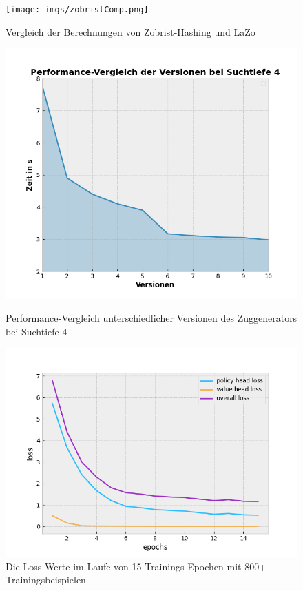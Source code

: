 \documentclass{jpp}
\begin{document}
\begin{figure}
  \centering
  \begin{minipage}[c]{0.33\textwidth}
    \texttt{[image: imgs/zobristComp.png]}
    \caption{Vergleich der Berechnungen von Zobrist-Hashing und LaZo}
    \label{fig:zobristPerf}
  \end{minipage}
  \hfill
  \begin{minipage}[c]{0.33\textwidth}
    \includegraphics[width=\textwidth]{imgs/Perft.png}
    \caption{Performance-Vergleich unterschiedlicher Versionen des Zuggenerators bei Suchtiefe 4}
    \label{fig:perft}
  \end{minipage}
  \hfill
  \begin{minipage}[c]{0.32\textwidth}
  \includegraphics[width={\textwidth}]{imgs/loss.png}
  \caption{Die Loss-Werte im Laufe von 15 Trainings-Epochen mit 800+ Trainingsbeispielen}
  
  \label{fig:loss}
  \end{minipage}
\end{figure}
\end{document}
